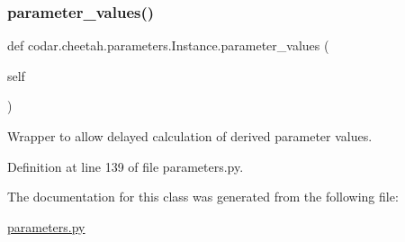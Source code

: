 \subsubsection{\texorpdfstring{parameter\+\_\+values()}{parameter\_values()}}
{\footnotesize\ttfamily def codar.\+cheetah.\+parameters.\+Instance.\+parameter\+\_\+values (\begin{DoxyParamCaption}\item[{}]{self }\end{DoxyParamCaption})}

\begin{DoxyVerb}Wrapper to allow delayed calculation of derived parameter values.\end{DoxyVerb}
 

Definition at line 139 of file parameters.\+py.



The documentation for this class was generated from the following file\+:\begin{DoxyCompactItemize}
\item 
\hyperlink{parameters_8py}{parameters.\+py}\end{DoxyCompactItemize}
